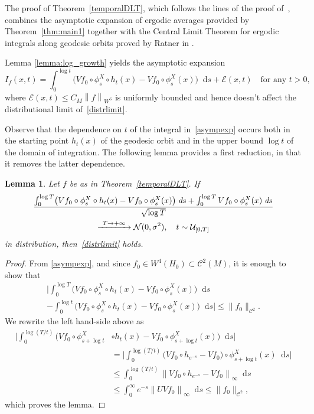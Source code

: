 \documentclass[10pt]{amsart}
\newcommand\To[1]{\mathchoice{\xrightarrow{\kern4pt#1\kern3pt}}{\stackrel{#1}{\longrightarrow}}{}{}}
\newcommand{\nnorm}[1]{\lVert#1\rVert}
\newcommand {\cN}{\mathcal{N}}
\newcommand*{\diff}{\mathop{}\!\mathrm{d}}
\newcommand{\norm}[1]{\left\lVert#1\right\rVert}
\newtheorem {lemma}[theorem]{Lemma}
\theoremstyle{definition}
\begin{document}
\begin{appendix}
The proof of Theorem~\ref{temporalDLT}, which follows the lines of the proof of~\cite[Th.\,5.1]{Dolgopyat-Sarig}, combines the asymptotic expansion of ergodic averages provided by Theorem~\ref{thm:main1} together with the Central Limit Theorem for ergodic integrals along geodesic orbits proved by Ratner in \cite{Rat:CLT}.

Lemma \ref{lemma:log_growth} yields the asymptotic expansion
\begin{equation}
\label{asympexp}
I_f(x,t)=\int_0^{\log{t}}\bigl(Vf_0\circ \phi^{X}_s\circ h_t(x)-Vf_0\circ \phi_s^{X}(x) \bigr)\diff s +\mathcal{E}(x,t) \quad\text{for any }t>0,
\end{equation}
where $\mathcal{E}(x,t) \leq C_M\norm{f}_{W^6}$ is uniformly bounded and hence doesn't affect the distributional limit of~\eqref{distrlimit}.

Observe that the dependence on $t$ of the integral in~\eqref{asympexp} occurs both in the starting point $h_t(x)$ of the geodesic orbit and in the upper bound $\log{t}$ of the domain of integration. The following lemma provides a first reduction, in that it removes the latter dependence.

\begin{lemma}
Let $f$ be as in Theorem~\ref{temporalDLT}. If
\begin{multline*}
\frac{\int_0^{\log{T}}\bigl(Vf_0\circ \phi^{X}_s\circ h_t(x)-Vf_0\circ \phi_s^{X}(x) \bigr)\;\emph{d}s+\int_0^{\log{T}}Vf_0\circ\phi^{X}_s(x)\;\emph{d}s}{\sqrt{\log{T}}}\\
\To{T\to+\infty}\cN(0,\sigma^{2}), \quad
 t\sim \mathcal{U}_{[0,T]}
\end{multline*}
in distribution, then~\eqref{distrlimit} holds.
\end{lemma}
\begin{proof}
From \eqref{asympexp}, and since $f_0 \in W^4(H_0) \subset \mathscr{C}^2(M)$, it is enough to show that
\begin{multline*}
\biggl\lvert \int_0^{\log{T}}\bigl(Vf_0\circ \phi^{X}_s\circ h_t(x)-Vf_0\circ \phi_s^{X}(x) \bigr) \diff s \\
- \int_0^{\log{t}}\bigl(Vf_0\circ \phi^{X}_s\circ h_t(x)-Vf_0\circ \phi_s^{X}(x) \bigr) \diff s \biggr \rvert \leq \nnorm{f_0}_{\mathscr{C}^2}.
\end{multline*}
We rewrite the left hand-side above as
\begin{align*}
\biggl\lvert \int_0^{\log{(T/t)}}\bigl(Vf_0\circ \phi^{X}_{s+ \log t}&\circ h_t(x)-Vf_0\circ \phi_{s+\log t}^{X}(x) \bigr) \diff s \biggr\rvert\\
&= \biggl\lvert \int_0^{\log{(T/t)}}\bigl(Vf_0\circ h_{e^{-s}} - Vf_0 \bigr) \circ \phi^{X}_{s+ \log t}(x) \diff s \biggr\rvert\\
&\leq \int_0^{\log{(T/t)}} \norm{Vf_0\circ h_{e^{-s}} - Vf_0}_{\infty} \diff s \\
&\leq \int_0^{\infty} e^{-s} \norm{UVf_0}_{\infty} \diff s \leq \nnorm{f_0}_{\mathscr{C}^2},
\end{align*}
which proves the lemma.
\end{proof}


\end{appendix}
\end{document}
